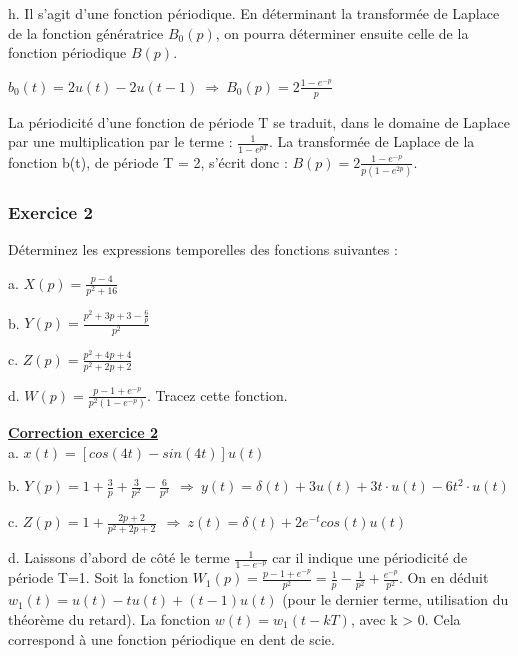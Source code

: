\documentclass[11pt]{report}
\begin{document}
	h. Il s'agit d'une fonction périodique. En déterminant la transformée de Laplace de la fonction génératrice $B_{0}(p)$, on pourra déterminer ensuite celle de la fonction périodique $B(p)$.
	
	$b_{0}(t)=2u(t)-2u(t-1)~\Rightarrow~B_{0}(p)=2\frac{1-e^{-p}}{p}$
	
	La périodicité d'une fonction de période T se traduit, dans le domaine de Laplace par une multiplication par le terme : $\frac{1}{1-e^{pT}}$. La transformée de Laplace de la fonction b(t), de période T = 2, s'écrit donc : $B(p) =2\frac{1-e^{-p}}{p(1-e^{2p})} $.
	
	\vspace{0.5\baselineskip}
	
	
	\subsubsection{Exercice 2}
	
	Déterminez les expressions temporelles des fonctions suivantes :
	
	a. $X(p)=\frac{p-4}{p^{2}+16}$ 
	
	b. $Y(p) = \frac{p^{2}+3p+3-\frac{6}{p}}{p^{2}}$ 
	
	c. $Z(p) = \frac{p^{2}+4p+4}{p^{2}+2p+2}$
	
	d. $W(p) = \frac{p-1+e^{-p}}{p^{2}(1-e^{-p})}$. Tracez cette fonction.
	
	
	\vspace{1\baselineskip}
	
	\textbf{\underline{Correction exercice 2}}\\
	
	a. $x(t)=[cos(4t)-sin(4t)]u(t)$
	
	b. $Y(p)=1+\frac{3}{p}+\frac{3}{p^{2}}-\frac{6}{p^{3}} ~~\Longrightarrow~ y(t)=\delta(t)+3u(t)+3t\cdot u(t)-6t^{2}\cdot u(t)$
	
	c. $Z(p)=1+\frac{2p+2}{p^{2}+2p+2}~~\Longrightarrow~z(t)=\delta(t)+2e^{-t}cos(t)u(t)$
	
	d. Laissons d'abord de côté le terme $\frac{1}{1-e^{-p}}$ car il indique une périodicité de période T=1. Soit la fonction $W_{1}(p)= \frac{p-1+e^{-p}}{p^{2}}=\frac{1}{p}-\frac{1}{p^{2}}+\frac{e^{-p}}{p^{2}}$. On en déduit $w_{1}(t)=u(t)-tu(t)+(t-1)u(t)$ (pour le dernier terme, utilisation du théorème du retard). La fonction $w(t) =w_{1}(t-kT)$, avec k > 0. Cela correspond à une fonction périodique en dent de scie.
	
	
	\vspace{1\baselineskip}
	
\end{document}

